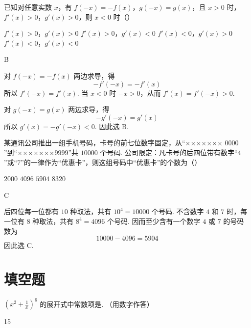 \begin{problem}
已知对任意实数 \(x\)，有 \(f(-x) = -f(x)\)，\(g(-x) = g(x)\)，且 \(x > 0\) 时，\(f'(x) > 0\)，\(g'(x) > 0\)，则 \(x < 0\) 时（\quad）

\choices
    {\(f'(x) > 0\)，\(g'(x) > 0\)}
    {\(f'(x) > 0\)，\(g'(x) < 0\)}
    {\(f'(x) < 0\)，\(g'(x) > 0\)}
    {\(f'(x) < 0\)，\(g'(x) < 0\)}
\end{problem}

\begin{answer}
B
\end{answer}

\begin{solution}
对 \(f(-x)=-f(x)\) 两边求导，得
\[
-f'(-x)=-f'(x)
\]
所以 \(f'(-x)=f'(x)\). 当 \(x<0\) 时 \(-x>0\)，从而 \(f'(x)=f'(-x)>0\).

对 \(g(-x)=g(x)\) 两边求导，得
\[
-g'(-x)=g'(x)
\]
所以 \(g'(x)=-g'(-x)<0\). 因此选 B.
\end{solution}

\begin{problem}
某通讯公司推出一组手机号码，卡号的前七位数字固定，从“××××××× \(0000\)”到“×××××××\(9999\)”共 \(10000\) 个号码. 公司限定：凡卡号的后四位带有数字“\(4\)”或“\(7\)”的一律作为“优惠卡”，则这组号码中“优惠卡”的个数为（\quad）

\choices
    {\(2000\)}
    {\(4096\)}
    {\(5904\)}
    {\(8320\)}
\end{problem}

\begin{answer}
C
\end{answer}

\begin{solution}
后四位每一位都有 \(10\) 种取法，共有 \(10^4=10000\) 个号码. 不含数字 \(4\) 和 \(7\) 时，每一位有 \(8\) 种取法，共有 \(8^4=4096\) 个号码. 因而至少含有一个数字 \(4\) 或 \(7\) 的号码数为
\[
10000-4096=5904
\]
因此选 C.
\end{solution}

\section{填空题}

\begin{problem}
\(\left( x^2 + \frac{1}{x} \right)^6\) 的展开式中常数项是\fillinblank{}. （用数字作答）
\end{problem}

\begin{answer}
15
\end{answer}

